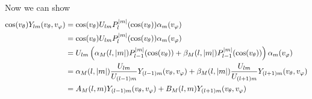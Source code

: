 \documentclass{article}[draft]
\begin{document}
Now we can show
\begin{align*}
\cos\of{\vtheta} Y_{lm}\of{\vtheta,\vphi}
&=
\cos\of{\vtheta} U_{lm} P^{|m|}_l\of{\cos\of{\vtheta}} \alpha_m\of{\vphi}
\\
&=
\cos\of{\vtheta} U_{lm} P^{|m|}_l\of{\cos\of{\vtheta}} \alpha_m\of{\vphi}
\\
&=
U_{lm} \left( \alpha_M\of{l,|m|} P^{|m|}_{l-1}\of{\cos\of{\vtheta}} 
+ \beta_M\of{l,|m|} P^{|m|}_{l-1}\of{\cos\of{\vtheta}} \right) \alpha_m\of{\vphi}
\\
&=
\alpha_M\of{l,|m|} \frac{U_{lm}}{U_{(l-1)m}} Y_{(l-1)m}\of{\vtheta,\vphi} 
+ \beta_M\of{l,|m|} \frac{U_{lm}}{U_{(l+1)m}} Y_{(l+1)m}\of{\vtheta,\vphi}
\\
&=
A_M\of{l,m} Y_{(l-1)m}\of{\vtheta,\vphi} 
+ 
B_M\of{l,m} Y_{(l+1)m}\of{\vtheta,\vphi}
\end{align*}
\end{document}
